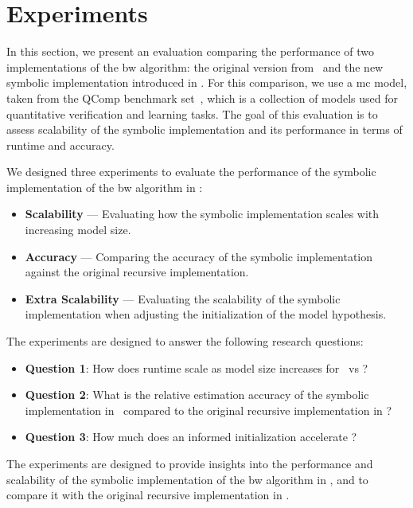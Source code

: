 \section{Experiments}\label{sec:experiments}
In this section, we present an evaluation comparing the performance of two implementations of the \gls{bw} algorithm: the original version from \Jajapy\ and the new symbolic implementation introduced in \JajapyTwo.
For this comparison, we use a \gls{mc} model, taken from the QComp benchmark set~\cite{hartmanns2019quantitative}, which is a collection of models used for quantitative verification and learning tasks.
The goal of this evaluation is to assess scalability of the symbolic implementation and its performance in terms of runtime and accuracy.

We designed three experiments to evaluate the performance of the symbolic implementation of the \gls{bw} algorithm in \JajapyTwo:
\begin{itemize}
    \item \textbf{Scalability} — Evaluating how the symbolic implementation scales with increasing model size.
    \item \textbf{Accuracy} — Comparing the accuracy of the symbolic implementation against the original recursive implementation.
    \item \textbf{Extra Scalability} — Evaluating the scalability of the symbolic implementation when adjusting the initialization of the model hypothesis.
\end{itemize}
The experiments are designed to answer the following research questions:
\begin{itemize}
    \item \textbf{Question 1}: How does runtime scale as model size increases for \JajapyTwo\ vs \Jajapy?
    \item \textbf{Question 2}: What is the relative estimation accuracy of the symbolic implementation in \JajapyTwo\ compared to the original recursive implementation in \Jajapy?
    \item \textbf{Question 3}: How much does an informed initialization accelerate \JajapyTwo?
\end{itemize}
The experiments are designed to provide insights into the performance and scalability of the symbolic implementation of the \gls{bw} algorithm in \JajapyTwo, and to compare it with the original recursive implementation in \Jajapy.

